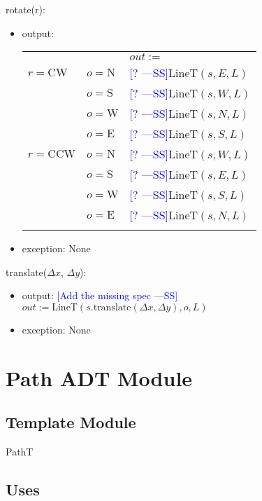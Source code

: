 \documentclass[12pt]{article}
\newcommand{\authornote}[3]{\textcolor{#1}{[#3 ---#2]}}
\newcommand{\authornote}[3]{}
\newcommand{\wss}[1]{\authornote{blue}{SS}{#1}}
\begin{document}
\noindent rotate(r):
\begin{itemize}
\item output: 
\begin{tabular}{|p{}|p{2.3cm}|l|}
\hhline{~|~|-|}
\multicolumn{1}{r}{} & \multicolumn{1}{r|}{} & \multicolumn{1}{l|}{$out :=$}\\
\hhline{|-|-|-|}
$r = \mbox{CW}$ & $o = \mbox{N}$ & \wss{?}$\mbox{LineT}(s, E, L)$\\
\hhline{|~|-|-|}
~ & $o = \mbox{S}$ & \wss{?}$\mbox{LineT}(s, W, L)$\\
\hhline{|~|-|-|}
~ & $o = \mbox{W}$ & \wss{?}$\mbox{LineT}(s, N, L)$\\
\hhline{|~|-|-|}
~ & $o = \mbox{E}$ & \wss{?}$\mbox{LineT}(s, S, L)$\\
\hhline{-|-|-|}
$r = \mbox{CCW}$ & $o = \mbox{N}$ & \wss{?}$\mbox{LineT}(s, W, L)$\\
\hhline{|~|-|-|}
~ & $o = \mbox{S}$ & \wss{?}$\mbox{LineT}(s, E, L)$\\
\hhline{|~|-|-|}
~ & $o = \mbox{W}$ & \wss{?}$\mbox{LineT}(s, S, L)$\\
\hhline{|~|-|-|}
~ & $o = \mbox{E}$ & \wss{?}$\mbox{LineT}(s, N, L)$\\
\hhline{-|-|-|}
\end{tabular}

\item exception: None
\end{itemize}

\noindent translate($\Delta x$, $\Delta y$):
\begin{itemize}
\item output: \wss{Add the missing spec}$out := \mbox{LineT}(s.\mbox{translate}(\Delta x, \Delta y), o, L)$
\item exception: None
\end{itemize}

\newpage

\section* {Path ADT Module}

\subsection*{Template Module}

PathT

\subsection* {Uses}
\end{document}
